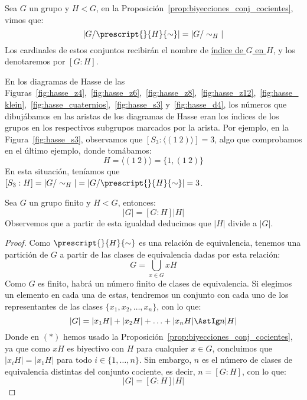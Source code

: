 \begin{definicion}
    Sea $G$ un grupo y $H<G$, en la Proposición~\ref{prop:biyecciones_conj_cocientes}, vimos que:
    \begin{equation*}
        |G/\prescript{}{H}{\sim}| = |G/\sim_H|
    \end{equation*}
    Los cardinales de estos conjuntos recibirán el nombre de \underline{índice de $G$ en $H$}, y los denotaremos por $[G:H]$.
\end{definicion}

\begin{ejemplo}
    En los diagramas de Hasse de las Figuras~\ref{fig:hasse_z4},~\ref{fig:hasse_z6},~\ref{fig:hasse_z8},~\ref{fig:hasse_z12},~\ref{fig:hasse_klein},~\ref{fig:hasse_cuaternios},~\ref{fig:hasse_s3} y~\ref{fig:hasse_d4}, los números que dibujábamos en las aristas de los diagramas de Hasse eran los índices de los grupos en los respectivos subgrupos marcados por la arista. Por ejemplo, en la Figura~\ref{fig:hasse_s3}, observamos que $[S_3:\langle (1\ 2) \rangle ] = 3$, algo que comprobamos en el último ejemplo, donde tomábamos:
    \begin{equation*}
        H = \langle (1\ 2) \rangle  = \{1, (1\ 2)\}
    \end{equation*}
    En esta situación, teníamos que $[S_3:H] = |G/\sim_H| = |G/\prescript{}{H}{\sim}| = 3$.
\end{ejemplo}

\begin{teo}[de Lagrange]\label{teo:lagrange} %
    Sea $G$ un grupo finito y $H < G$, entonces:
    \begin{equation*}
        |G| = [G:H]|H|
    \end{equation*}
    Observemos que a partir de esta igualdad deducimos que $|H|$ divide a $|G|$.
    \begin{proof}
        Como $\prescript{}{H}{\sim}$ es una relación de equivalencia, tenemos una partición de $G$ a partir de las clases de equivalencia dadas por esta relación:
        \begin{equation*}
            G = \bigcup_{x\in G} xH
        \end{equation*}
        Como $G$ es finito, habrá un número finito de clases de equivalencia. Si elegimos un elemento en cada una de estas, tendremos un conjunto con cada uno de los representantes de las clases $\{x_1, x_2, \ldots, x_n\}$, con lo que:
        \begin{equation*}
            |G| = |x_1H| + |x_2H| + \ldots + |x_nH| \AstIg n|H|
        \end{equation*}
        Donde en $(\ast)$ hemos usado la Proposición~\ref{prop:biyecciones_conj_cocientes}, ya que como $xH$ es biyectivo con $H$ para cualquier $x\in G$, concluimos que $|x_iH| = |x_1H|$ para todo $i \in \{1,\ldots,n\}$. Sin embargo, $n$ es el número de clases de equivalencia distintas del conjunto cociente, es decir, $n=[G:H]$, con lo que:
        \begin{equation*}
            |G| = [G:H]|H|
        \end{equation*}
    \end{proof}
\end{teo}

